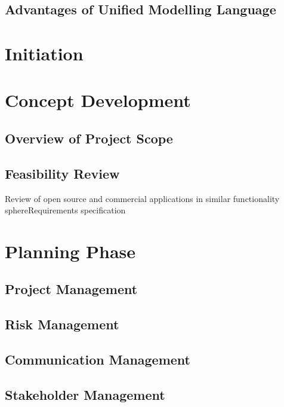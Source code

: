 \documentclass[a4paper,12pt]{article}
\begin{document}
\subsection {Advantages of Unified Modelling Language}



\section {Initiation}


\section {Concept Development}


\subsection {Overview of Project Scope}
\subsection {Feasibility Review}
Review of open source and commercial applications in similar functionality sphereRequirements specification

\section {Planning Phase}

\subsection {Project Management}
\subsection {Risk Management}
\subsection {Communication Management}
\subsection {Stakeholder Management}
\end{document}
